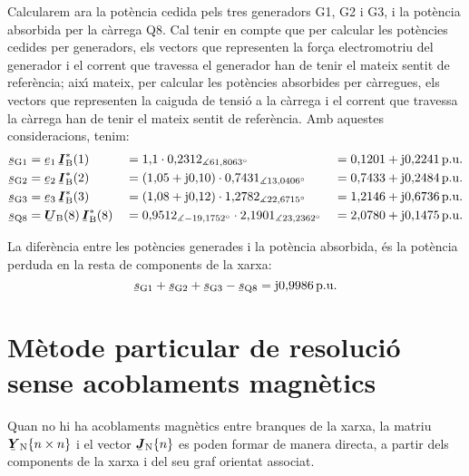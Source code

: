 \begin{exemple}
Calcularem ara la pot\`{e}ncia cedida pels tres generadors G1, G2 i G3, i la pot\`{e}ncia absorbida per la c\`{a}rrega Q8. Cal tenir en compte que per calcular les pot\`{e}ncies cedides per generadors, els vectors que representen la for\c{c}a electromotriu del generador i el corrent que travessa el generador han de tenir el mateix sentit de refer\`{e}ncia; aix\'{\i} mateix, per calcular les pot\`{e}ncies absorbides per c\`{a}rregues, els vectors que representen la caiguda de tensi\'{o} a la c\`{a}rrega i el corrent que travessa la c\`{a}rrega han de tenir el mateix sentit de refer\`{e}ncia. Amb aquestes consideracions, tenim:
\begin{alignat*}{3}
   \cmplx{s}\ped{G1} &= \cmplx{e}\ped{1} \, \mcmplx{I}\ped{B}^*(1) &&= 1{,}1 \cdot
    0{,}2312_{\measuredangle 61{,}8063\degree} &&= 0{,}1201 + \ju 0{,}2241 \unit{p.u.} \\
   \cmplx{s}\ped{G2} &= \cmplx{e}\ped{2} \, \mcmplx{I}\ped{B}^*(2) &&=
   (1{,}05 + \ju 0{,}10) \cdot 0{,}7431_{\measuredangle 13{,}0406\degree} &&=
   0{,}7433 + \ju 0{,}2484\unit{p.u.}   \\
   \cmplx{s}\ped{G3} &= \cmplx{e}\ped{3} \, \mcmplx{I}\ped{B}^*(3) &&=
   (1{,}08 + \ju 0{,}12) \cdot 1{,}2782_{\measuredangle 22{,}6715\degree} &&=
   1{,}2146 + \ju 0{,}6736\unit{p.u.}   \\
   \cmplx{s}\ped{Q8} &= \mcmplx{U}\ped{B}(8) \, \mcmplx{I}\ped{B}^*(8) &&=
   0{,}9512_{\measuredangle -19{,}1752\degree} \cdot 2{,}1901_{\measuredangle          23{,}2362\degree}     &&= 2{,}0780 + \ju 0{,}1475\unit{p.u.}
\end{alignat*}

La difer\`{e}ncia entre les pot\`{e}ncies generades i la pot\`{e}ncia absorbida, \'{e}s la pot\`{e}ncia perduda en la resta de components de la xarxa:
\[
   \cmplx{s}\ped{G1} + \cmplx{s}\ped{G2} + \cmplx{s}\ped{G3} -
   \cmplx{s}\ped{Q8} = \ju 0{,}9986\unit{p.u.}
\]
\end{exemple}


\section{M\`{e}tode particular de resoluci\'{o} sense acoblaments magn\`{e}tics}

Quan no hi ha acoblaments magn\`{e}tics entre branques de la xarxa, la matriu $\mcmplx{Y}\ped{N}\{n \times n\}$ i el vector $\mcmplx{J}\ped{N}\{n\}$ es poden formar de manera directa, a partir dels components de la xarxa i del seu graf orientat associat.

